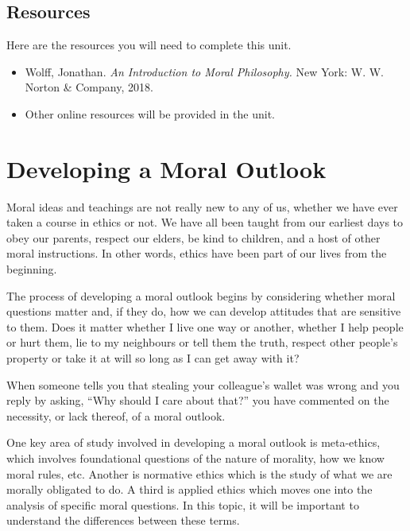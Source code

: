 \documentclass[
]{book}
\providecommand{\tightlist}{%
  \setlength{\itemsep}{0pt}\setlength{\parskip}{0pt}}
\begin{document}
\hypertarget{resources}{%
\subsection*{Resources}\label{resources}}

Here are the resources you will need to complete this unit.

\begin{itemize}
\tightlist
\item
  Wolff, Jonathan. \emph{An Introduction to Moral Philosophy.} New York: W. W. Norton \& Company, 2018.\\
\item
  Other online resources will be provided in the unit.
\end{itemize}

\hypertarget{developing-a-moral-outlook}{%
\section{Developing a Moral Outlook}\label{developing-a-moral-outlook}}

Moral ideas and teachings are not really new to any of us, whether we have ever taken a course in ethics or not. We have all been taught from our earliest days to obey our parents, respect our elders, be kind to children, and a host of other moral instructions. In other words, ethics have been part of our lives from the beginning.

The process of developing a moral outlook begins by considering whether moral questions matter and, if they do, how we can develop attitudes that are sensitive to them. Does it matter whether I live one way or another, whether I help people or hurt them, lie to my neighbours or tell them the truth, respect other people's property or take it at will so long as I can get away with it?

When someone tells you that stealing your colleague's wallet was wrong and you reply by asking, ``Why should I care about that?'' you have commented on the necessity, or lack thereof, of a moral outlook.

One key area of study involved in developing a moral outlook is meta-ethics, which involves foundational questions of the nature of morality, how we know moral rules, etc. Another is normative ethics which is the study of what we are morally obligated to do. A third is applied ethics which moves one into the analysis of specific moral questions. In this topic, it will be important to understand the differences between these terms.
\end{document}
